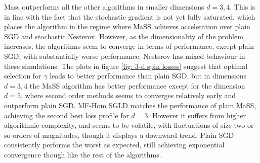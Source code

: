 \documentclass{article}
\begin{document}
Mass outperforms all the other algorithms in smaller dimensions $ d=3, 4$. This is in line with the fact that the stochastic gradient is not yet fully saturated, which places the algorithm in the regime where MaSS achieves acceleration over plain SGD and stochastic Nesterov. However, as the dimensionality of the problem increases, the algorithms seem to converge in terms of performance, except plain SGD, with substantially worse performance. Nesterov has mixed behaviour in these simulations. The plots in figure \ref{fig: 3-d spin losses} suggest that optimal selection for $ \gamma$ leads to better performance than plain SGD, but in dimensions $ d=3, 4$ the MaSS algorithm has better performance except for the dimension $ d=5$, where second order methods seems to converges relatively early and outperform plain SGD. MF-Hom SGLD matches the performance of plain MaSS, achieving the second best loss profile for $ d=3$. However it suffers from higher algorithmic complexity, and seems to be volatile, with fluctuations of size two or so orders of magnitudes, though it displays a downward trend. Plain SGD consistently performs the worst as expected, still achieving exponential convergence though like the rest of the algorithms. \\
\end{document}
